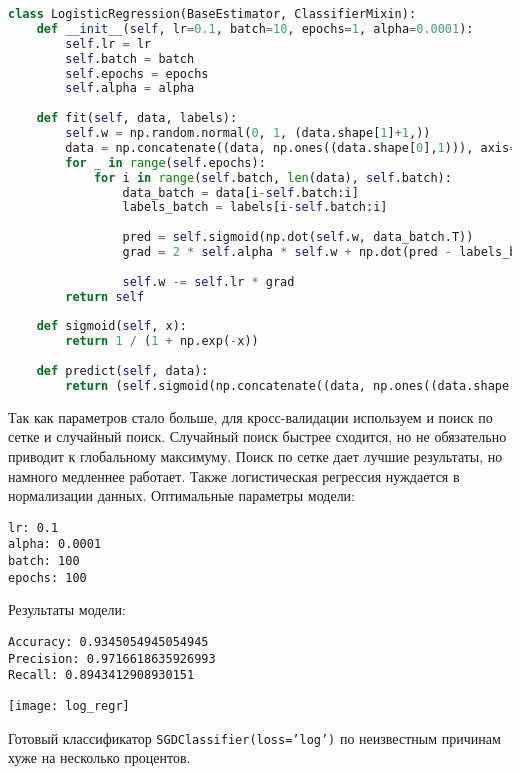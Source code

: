 \begin{lstlisting}[language=python, keepspaces=true]
class LogisticRegression(BaseEstimator, ClassifierMixin):
    def __init__(self, lr=0.1, batch=10, epochs=1, alpha=0.0001):
        self.lr = lr
        self.batch = batch
        self.epochs = epochs
        self.alpha = alpha
    
    def fit(self, data, labels):
        self.w = np.random.normal(0, 1, (data.shape[1]+1,))
        data = np.concatenate((data, np.ones((data.shape[0],1))), axis=1)
        for _ in range(self.epochs):
            for i in range(self.batch, len(data), self.batch):
                data_batch = data[i-self.batch:i]
                labels_batch = labels[i-self.batch:i]
                
                pred = self.sigmoid(np.dot(self.w, data_batch.T))
                grad = 2 * self.alpha * self.w + np.dot(pred - labels_batch, data_batch)
                
                self.w -= self.lr * grad
        return self
    
    def sigmoid(self, x):
        return 1 / (1 + np.exp(-x))
    
    def predict(self, data):
        return (self.sigmoid(np.concatenate((data, np.ones((data.shape[0],1))), axis=1).dot(self.w)) > 0.5).astype('int64')
\end{lstlisting}

Так как параметров стало больше, для кросс-валидации используем и поиск по сетке и случайный поиск. Случайный поиск быстрее сходится, но не обязательно приводит к глобальному максимуму. Поиск по сетке дает лучшие результаты, но намного медленнее работает. Также логистическая регрессия нуждается в нормализации данных. Оптимальные параметры модели:

\begin{lstlisting}[frame=none, numbers=none]
lr: 0.1
alpha: 0.0001
batch: 100
epochs: 100
\end{lstlisting}

Результаты модели:

\begin{lstlisting}[frame=none, numbers=none]
Accuracy: 0.9345054945054945
Precision: 0.9716618635926993
Recall: 0.8943412908930151
\end{lstlisting}
\texttt{[image: log\_regr]}

Готовый классификатор {\tt SGDClassifier(loss='log')} по неизвестным причинам хуже на несколько процентов.


